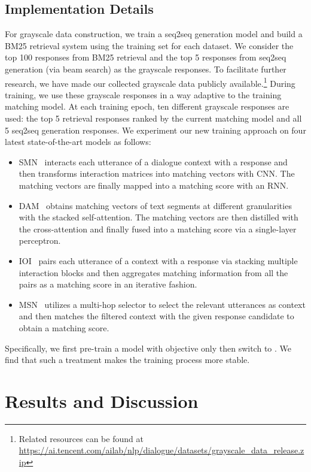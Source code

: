 \documentclass[11pt,a4paper]{article}
\begin{document}
	\subsection{Implementation Details}
	For grayscale data construction, we train a seq2seq generation model and build a BM25 retrieval system using the training set for each dataset. We consider the top 100 responses from BM25 retrieval and the top 5 responses from seq2seq generation (via beam search) as the grayscale responses. To facilitate further research, we have made our collected grayscale data publicly available.\footnote{Related resources can be found at \url{https://ai.tencent.com/ailab/nlp/dialogue/datasets/grayscale_data_release.zip}} During training, we use these grayscale responses in a way adaptive to the training matching model. At each training epoch, ten different grayscale responses are used: the top 5 retrieval responses ranked by the current matching model and all 5 seq2seq generation responses. We experiment our new training approach on four latest state-of-the-art models as follows:
	\begin{itemize}
		\item{SMN}~\cite{wu2017sequential} interacts each utterance of a dialogue context with a response and then transforms interaction matrices into matching vectors with CNN. The matching vectors are finally mapped into a matching score with an RNN.
		\item{DAM}~\cite{zhou2018multi} obtains matching vectors of text segments at different granularities with the stacked self-attention. The matching vectors are then distilled with the cross-attention and finally fused into a matching score via a single-layer perceptron.
		\item{IOI}~\cite{tao2019one} pairs each utterance of a context with a response via stacking multiple interaction blocks and then aggregates matching information from all the pairs as a matching score in an iterative fashion.
		\item{MSN}~\cite{yuan2019multi} utilizes a multi-hop selector to select the relevant utterances as context and then matches the filtered context with the given response candidate to obtain a matching score.
	\end{itemize}
	Specifically, we first pre-train a model with objective  only then switch to . We find that such a treatment makes the training process more stable.
	
\section{Results and Discussion}
\end{document}
